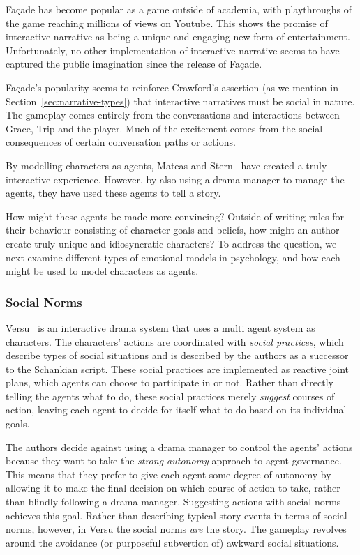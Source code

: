 \documentclass[11pt]{report}
\newcommand{\changed}[2]{%
  \todo[noline,bordercolor=white,color=yellow,size=\scriptsize]{#2}
  \cbcolor{yellow}
  \begin{changebar}
    #1
  \end{changebar}%
  }%
\newcommand{\changed}[2]{#1}
\begin{document}
Fa\c{c}ade has become popular as a game outside of academia, with playthroughs of the game reaching millions of views on Youtube. This shows the promise of interactive narrative as being a unique and engaging new form of entertainment. Unfortunately, no other implementation of interactive narrative seems to have captured the public imagination since the release of Fa\c{c}ade.

Fa\c{c}ade's popularity seems to reinforce Crawford's assertion (as we mention
in Section~\ref{sec:narrative-types}) that interactive narratives must be social
in nature. The gameplay comes entirely from the conversations and interactions
between Grace, Trip and the player. Much of the excitement comes from the social
consequences of certain conversation paths or actions. \changed{By modelling characters
as agents, Mateas and Stern~\cite{mateas2003faccade} have created a truly
interactive experience. However, by also using a drama manager to manage the
agents, they have used these agents to tell a story.}{Replaced Mateas et al with
bibtex reference}

How might these agents be made more convincing? Outside of writing rules for their behaviour consisting of character goals and beliefs, how might an author create truly unique and idiosyncratic characters? To address the question, we next examine different types of emotional models in psychology, and how each might be used to model characters as agents.

\subsubsection{Social Norms}
Versu~\citep{evans2014versu} is an interactive drama system that uses a multi agent system as characters. The characters' actions are coordinated with \emph{social practices}, which describe types of social situations and is described by the authors as a successor to the Schankian script. These social practices are implemented as reactive joint plans, which agents can choose to participate in or not. Rather than directly telling the agents what to do, these social practices merely \emph{suggest} courses of action, leaving each agent to decide for itself what to do based on its individual goals.

The authors decide against using a drama manager to control the agents' actions because they want to take the \emph{strong autonomy} approach to agent governance. This means that they prefer to give each agent some degree of autonomy by allowing it to make the final decision on which course of action to take, rather than blindly following a drama manager. Suggesting actions with social norms achieves this goal. Rather than describing typical story events in terms of social norms, however, in Versu the social norms \emph{are} the story. The gameplay revolves around the avoidance (or purposeful subvertion of) awkward social situations.
\end{document}

